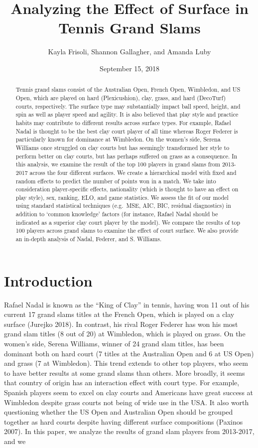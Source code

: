 \documentclass[]{article}
\title{Analyzing the Effect of Surface in Tennis Grand Slams}
\author{Kayla Frisoli, Shannon Gallagher, and Amanda Luby}
\date{September 15, 2018}
\begin{document}
\maketitle
\begin{abstract}
Tennis grand slams consist of the Australian Open, French Open,
Wimbledon, and US Open, which are played on hard (Plexicushion), clay,
grass, and hard (DecoTurf) courts, respectively. The surface type may
substantially impact ball speed, height, and spin as well as player
speed and agility. It is also believed that play style and practice
habits may contribute to different results across surface types. For
example, Rafael Nadal is thought to be the best clay court player of all
time whereas Roger Federer is particularly known for dominance at
Wimbledon. On the women's side, Serena Williams once struggled on clay
courts but has seemingly transformed her style to perform better on clay
courts, but has perhaps suffered on grass as a consequence. In this
analysis, we examine the result of the top 100 players in grand slams
from 2013-2017 across the four different surfaces. We create a
hierarchical model with fixed and random effects to predict the number
of points won in a match. We take into consideration player-specific
effects, nationality (which is thought to have an effect on play style),
sex, ranking, ELO, and game statistics. We assess the fit of our model
using standard statistical techniques (e.g.~MSE, AIC, BIC, residual
diagnostics) in addition to `common knowledge' factors (for instance,
Rafael Nadal should be indicated as a superior clay court player by the
model). We compare the results of top 100 players across grand slams to
examine the effect of court surface. We also provide an in-depth
analysis of Nadal, Federer, and S. Williams.
\end{abstract}

\hypertarget{sec:iintro}{%
\section{Introduction}\label{sec:iintro}}

Rafael Nadal is known as the ``King of Clay'' in tennis, having won 11
out of his current 17 grand slams titles at the French Open, which is
played on a clay surface (Jurejko 2018). In contrast, his rival Roger
Federer has won his most grand slam titles (8 out of 20) at Wimbledon,
which is played on grass. On the women's side, Serena Williams, winner
of 24 grand slam titles, has been dominant both on hard court (7 titles
at the Australian Open and 6 at US Open) and grass (7 at Wimbledon).
This trend extends to other top players, who seem to have better results
at some grand slams than others. More broadly, it seems that country of
origin has an interaction effect with court type. For example, Spanish
players seem to excel on clay courts and Americans have great success at
Wimbledon despite grass courts not being of wide use in the USA. It also
worth questioning whether the US Open and Australian Open should be
grouped together as hard courts despite having different surface
compositions (Paxinos 2007). In this paper, we analyze the results of
grand slam players from 2013-2017, and we
\end{document}
